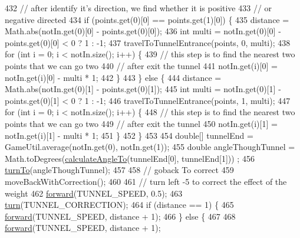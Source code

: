 \begin{DoxyCode}
432     \textcolor{comment}{// after identify it's direction, we find whether it is positive}
433     \textcolor{comment}{// or negative directed}
434     \textcolor{keywordflow}{if} (points.get(0)[0] == points.get(1)[0]) \{
435       distance = Math.abs(notIn.get(0)[0] - points.get(0)[0]);
436       \textcolor{keywordtype}{int} multi = notIn.get(0)[0] - points.get(0)[0] < 0 ? 1 : -1;
437       travelToTunnelEntrance(points, 0, multi);
438       \textcolor{keywordflow}{for} (\textcolor{keywordtype}{int} i = 0; i < notIn.size(); i++) \{
439         \textcolor{comment}{// this step is to find the nearest two points that we can go two}
440         \textcolor{comment}{// after exit the tunnel}
441         notIn.get(i)[0] = notIn.get(i)[0] - multi * 1;
442       \}
443     \} \textcolor{keywordflow}{else} \{
444       distance = Math.abs(notIn.get(0)[1] - points.get(0)[1]);
445       \textcolor{keywordtype}{int} multi = notIn.get(0)[1] - points.get(0)[1] < 0 ? 1 : -1;
446       travelToTunnelEntrance(points, 1, multi);
447       \textcolor{keywordflow}{for} (\textcolor{keywordtype}{int} i = 0; i < notIn.size(); i++) \{
448         \textcolor{comment}{// this step is to find the nearest two points that we can go two}
449         \textcolor{comment}{// after exit the tunnel}
450         notIn.get(i)[1] = notIn.get(i)[1] - multi * 1;
451       \}
452     \}
453 
454     \textcolor{keywordtype}{double}[] tunnelEnd = GameUtil.average(notIn.get(0), notIn.get(1));
455     \textcolor{keywordtype}{double} angleThoughTunnel = Math.toDegrees(\hyperlink{classca_1_1mcgill_1_1ecse211_1_1project_1_1_navigation_a4376e54162df8f123ca3b52e4fd2f38d}{calculateAngleTo}(tunnelEnd[0], tunnelEnd[1]))
      ;
456     \hyperlink{classca_1_1mcgill_1_1ecse211_1_1project_1_1_navigation_a3bbe0645f2b3b3d0986b4a707fb5a00c}{turnTo}(angleThoughTunnel);
457 
458     \textcolor{comment}{// goback To correct}
459     moveBackWithCorrection();
460 
461     \textcolor{comment}{// turn left -5 to correct the effect of the weight}
462     \hyperlink{classca_1_1mcgill_1_1ecse211_1_1project_1_1_navigation_a7c66610c5b7496ddb35d342ab2cd3f08}{forward}(TUNNEL\_SPEED, 0.5);
463     \hyperlink{classca_1_1mcgill_1_1ecse211_1_1project_1_1_navigation_ad74286ad36d333bfaf57661837457b76}{turn}(TUNNEL\_CORRECTION);
464     \textcolor{keywordflow}{if} (distance == 1) \{
465       \hyperlink{classca_1_1mcgill_1_1ecse211_1_1project_1_1_navigation_a7c66610c5b7496ddb35d342ab2cd3f08}{forward}(TUNNEL\_SPEED, distance + 1);
466     \} \textcolor{keywordflow}{else} \{
467 
468       \hyperlink{classca_1_1mcgill_1_1ecse211_1_1project_1_1_navigation_a7c66610c5b7496ddb35d342ab2cd3f08}{forward}(TUNNEL\_SPEED, distance + 1);

\end{DoxyCode}
